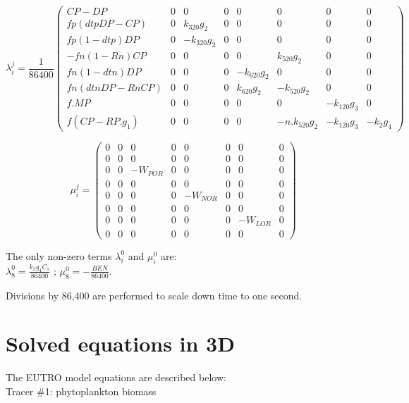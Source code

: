 $$  \lambda_i^j = \frac{1}{86400}
  \begin{pmatrix}
    CP-DP               & 0 &            0 & 0 & 0 & 0 & 0 & 0 \\
    fp (dtp DP -CP)     & 0 &  k_{320} g_2  & 0 & 0 & 0 & 0 & 0 \\
    fp (1-dtp) DP       & 0 & -k_{320} g_2  & 0 & 0 & 0 & 0 & 0 \\
   -fn (1 -Rn) CP       & 0 &        0 & 0 & 0 &  k_{520} g_2 & 0 & 0 \\
    fn (1-dtn) DP       & 0 &        0 & 0 & -k_{620} g_2 & 0 & 0 & 0 \\
    fn (dtn DP - Rn CP) & 0 &        0 & 0 &  k_{620} g_2 & -k_{520} g_2 & 0 & 0 \\
    f . MP              & 0 &        0 & 0 & 0 & 0 & -k_{120} g_3 & 0 \\
    f (CP - RP .  g_1 ) & 0 &        0 & 0 & 0 & -n.k_{520} g_2 & -k_{120} g_3 & - k_2 g_4
  \end{pmatrix}
$$

$$
  \mu_i^j =
  \begin{pmatrix}
   0 & 0 & 0 & 0 & 0 & 0 & 0 & 0 \\
   0 & 0 & 0 & 0 & 0 & 0 & 0 & 0 \\
   0 & 0 & -W_{POR} & 0 & 0 & 0 & 0 & 0 \\
   0 & 0 & 0 & 0 & 0 & 0 & 0 & 0 \\
   0 & 0 & 0 & 0 & -W_{NOR} & 0 & 0 & 0 \\
   0 & 0 & 0 & 0 & 0 & 0 & 0 & 0 \\
   0 & 0 & 0 & 0 & 0 & 0 & -W_{LOR} & 0 \\
   0 & 0 & 0 & 0 & 0 & 0 & 0 & 0
  \end{pmatrix}
$$

The only non-zero terms $\lambda_i^0$ and $\mu_i^0$ are:\\

$\lambda_8^0 = \frac{k_2 g_4 C_s}{86400}$ ; $\mu_8^0 = -\frac{BEN}{86400}$.

Divisions by 86,400 are performed to scale down time to one second.

\section{Solved equations in 3D}

The EUTRO model equations are described below:\\

Tracer $\#$1: phytoplankton biomass

